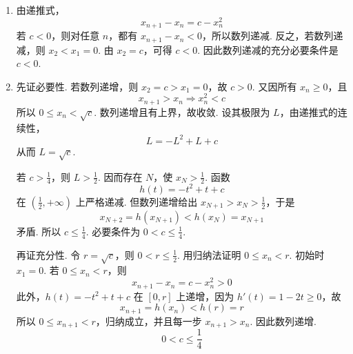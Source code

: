 \begin{solution}
\begin{enumerate}
\item 由递推式，
\[
x_{n+1}-x_n=c-x_n^2
\]
若 \(c<0\)，则对任意 \(n\)，都有 \(x_{n+1}-x_n<0\)，所以数列递减.
反之，若数列递减，则 \(x_2<x_1=0\). 由 \(x_2=c\)，可得 \(c<0\). 因此数列递减的充分必要条件是 \(c<0\).
\item 先证必要性. 若数列递增，则 \(x_2=c>x_1=0\)，故 \(c>0\). 又因所有 \(x_n\geqslant0\)，且
\[
x_{n+1}>x_n\Longrightarrow x_n^2<c
\]
所以 \(0\leqslant x_n<\sqrt c\). 数列递增且有上界，故收敛. 设其极限为 \(L\)，由递推式的连续性，
\[
L=-L^2+L+c
\]
从而 \(L=\sqrt c\).

若 \(c>\frac14\)，则 \(L>\frac12\). 因而存在 \(N\)，使 \(x_N>\frac12\). 函数
\[
h(t)=-t^2+t+c
\]
在 \((\frac12,+\infty)\) 上严格递减. 但数列递增给出 \(x_{N+1}>x_N>\frac12\)，于是
\[
x_{N+2}=h(x_{N+1})<h(x_N)=x_{N+1}
\]
矛盾. 所以 \(c\leqslant\frac14\). 必要条件为 \(0<c\leqslant\frac14\).

再证充分性. 令 \(r=\sqrt c\)，则 \(0<r\leqslant\frac12\). 用归纳法证明 \(0\leqslant x_n<r\). 初始时 \(x_1=0\). 若 \(0\leqslant x_n<r\)，则
\[
x_{n+1}-x_n=c-x_n^2>0
\]
此外，\(h(t)=-t^2+t+c\) 在 \([0,r]\) 上递增，因为 \(h'(t)=1-2t\geqslant0\)，故
\[
x_{n+1}=h(x_n)<h(r)=r
\]
所以 \(0\leqslant x_{n+1}<r\)，归纳成立，并且每一步 \(x_{n+1}>x_n\). 因此数列递增.
\[
0<c\leqslant\frac14
\]
\end{enumerate}
\end{solution}
